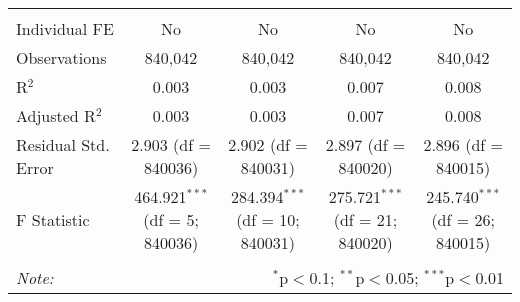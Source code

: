 \documentclass[
]{article}
\begin{document}
\begin{table}[!htbp]
{\begin{tabular}{@{\extracolsep{5pt}}lcccc}
  & & & & \\ 
\hline \\[-1.8ex] 
Individual FE & No & No & No & No \\ 
Observations & 840,042 & 840,042 & 840,042 & 840,042 \\ 
R$^{2}$ & 0.003 & 0.003 & 0.007 & 0.008 \\ 
Adjusted R$^{2}$ & 0.003 & 0.003 & 0.007 & 0.008 \\ 
Residual Std. Error & 2.903 (df = 840036) & 2.902 (df = 840031) & 2.897 (df = 840020) & 2.896 (df = 840015) \\ 
F Statistic & 464.921$^{***}$ (df = 5; 840036) & 284.394$^{***}$ (df = 10; 840031) & 275.721$^{***}$ (df = 21; 840020) & 245.740$^{***}$ (df = 26; 840015) \\ 
\hline 
\hline \\[-1.8ex] 
\textit{Note:}  & \multicolumn{4}{r}{$^{*}$p$<$0.1; $^{**}$p$<$0.05; $^{***}$p$<$0.01} \\ 
\end{tabular}
} 
\end{table} 
\newpage
\end{document}
